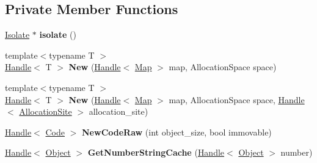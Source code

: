 \subsection*{Private Member Functions}
\begin{DoxyCompactItemize}
\item 
\hyperlink{classv8_1_1internal_1_1_isolate}{Isolate} $\ast$ {\bfseries isolate} ()\hypertarget{classv8_1_1internal_1_1_factory_afe4ed02006b4f3a6675aa96caaf4bb15}{}\label{classv8_1_1internal_1_1_factory_afe4ed02006b4f3a6675aa96caaf4bb15}

\item 
{\footnotesize template$<$typename T $>$ }\\\hyperlink{classv8_1_1internal_1_1_handle}{Handle}$<$ T $>$ {\bfseries New} (\hyperlink{classv8_1_1internal_1_1_handle}{Handle}$<$ \hyperlink{classv8_1_1internal_1_1_map}{Map} $>$ map, Allocation\+Space space)\hypertarget{classv8_1_1internal_1_1_factory_a9a6ac2688d8d2d82e39e50d704814956}{}\label{classv8_1_1internal_1_1_factory_a9a6ac2688d8d2d82e39e50d704814956}

\item 
{\footnotesize template$<$typename T $>$ }\\\hyperlink{classv8_1_1internal_1_1_handle}{Handle}$<$ T $>$ {\bfseries New} (\hyperlink{classv8_1_1internal_1_1_handle}{Handle}$<$ \hyperlink{classv8_1_1internal_1_1_map}{Map} $>$ map, Allocation\+Space space, \hyperlink{classv8_1_1internal_1_1_handle}{Handle}$<$ \hyperlink{classv8_1_1internal_1_1_allocation_site}{Allocation\+Site} $>$ allocation\+\_\+site)\hypertarget{classv8_1_1internal_1_1_factory_a59b62afa153e34c956fdc07b504bba56}{}\label{classv8_1_1internal_1_1_factory_a59b62afa153e34c956fdc07b504bba56}

\item 
\hyperlink{classv8_1_1internal_1_1_handle}{Handle}$<$ \hyperlink{classv8_1_1internal_1_1_code}{Code} $>$ {\bfseries New\+Code\+Raw} (int object\+\_\+size, bool immovable)\hypertarget{classv8_1_1internal_1_1_factory_a63fee3b663d44fde6c58c362dbbb128b}{}\label{classv8_1_1internal_1_1_factory_a63fee3b663d44fde6c58c362dbbb128b}

\item 
\hyperlink{classv8_1_1internal_1_1_handle}{Handle}$<$ \hyperlink{classv8_1_1internal_1_1_object}{Object} $>$ {\bfseries Get\+Number\+String\+Cache} (\hyperlink{classv8_1_1internal_1_1_handle}{Handle}$<$ \hyperlink{classv8_1_1internal_1_1_object}{Object} $>$ number)\hypertarget{classv8_1_1internal_1_1_factory_abac2730ec2c173436898ee930cf0aac5}{}\label{classv8_1_1internal_1_1_factory_abac2730ec2c173436898ee930cf0aac5}


\end{DoxyCompactItemize}
